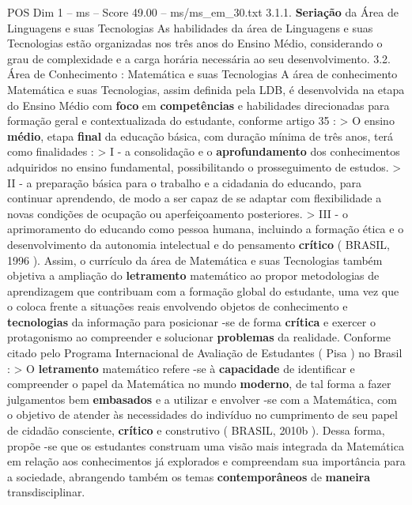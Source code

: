 \begin{textsample}{POS Dim 1 – ms – Score 49.00 – ms/ms\_em\_30.txt}  \label{ex:f1_pos_184}
3.1.1. \textbf{Seriação} da Área de Linguagens e suas Tecnologias As habilidades da área de Linguagens e suas Tecnologias estão organizadas nos três anos do Ensino Médio, considerando o grau de complexidade e a carga horária necessária ao seu desenvolvimento. 3.2.
Área de Conhecimento : Matemática e suas Tecnologias A área de conhecimento Matemática e suas Tecnologias, assim definida pela LDB, é desenvolvida na etapa do Ensino Médio com \textbf{foco} em \textbf{competências} e habilidades direcionadas para formação geral e contextualizada do estudante, conforme artigo 35 : > O ensino \textbf{médio}, etapa \textbf{final} da educação básica, com duração mínima de três anos, terá como finalidades : > I - a consolidação e o \textbf{aprofundamento} dos conhecimentos adquiridos no ensino fundamental, possibilitando o prosseguimento de estudos. > II - a preparação básica para o trabalho e a cidadania do educando, para continuar aprendendo, de modo a ser capaz de se adaptar com flexibilidade a novas condições de ocupação ou aperfeiçoamento posteriores. > III - o aprimoramento do educando como pessoa humana, incluindo a formação ética e o desenvolvimento da autonomia intelectual e do pensamento \textbf{crítico} ( BRASIL, 1996 ).
Assim, o currículo da área de Matemática e suas Tecnologias também objetiva a ampliação do \textbf{letramento} matemático ao propor metodologias de aprendizagem que contribuam com a formação global do estudante, uma vez que o coloca frente a situações reais envolvendo objetos de conhecimento e \textbf{tecnologias} da informação para posicionar -se de forma \textbf{crítica} e exercer o protagonismo ao compreender e solucionar \textbf{problemas} da realidade.
Conforme citado pelo Programa Internacional de Avaliação de Estudantes ( Pisa ) no Brasil : > O \textbf{letramento} matemático refere -se à \textbf{capacidade} de identificar e compreender o papel da Matemática no mundo \textbf{moderno}, de tal forma a fazer julgamentos bem \textbf{embasados} e a utilizar e envolver -se com a Matemática, com o objetivo de atender às necessidades do indivíduo no cumprimento de seu papel de cidadão consciente, \textbf{crítico} e construtivo ( BRASIL, 2010b ).
Dessa forma, propõe -se que os estudantes construam uma visão mais integrada da Matemática em relação aos conhecimentos já explorados e compreendam sua importância para a sociedade, abrangendo também os temas \textbf{contemporâneos} de \textbf{maneira} transdisciplinar.

\end{textsample}
